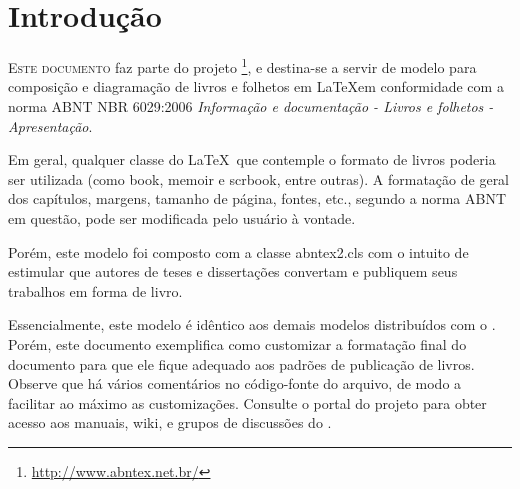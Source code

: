 \documentclass[
	10pt,				%
	openright,			%
	twoside,			%
	a5paper,			%
	english,			%
	french,				%
	brazil,				%
	sumario=tradicional
]{abntex2}
\renewcommand{\textual}{%
  \pagestyle{abntbookheadings}%
  \aliaspagestyle{chapter}{abntbookchapfirst}%
  \nouppercaseheads%
  \bookmarksetup{startatroot}%
}
\begin{document}
\listoffigures*
\cleardoublepage

\listoftables*
\cleardoublepage

\tableofcontents*
\cleardoublepage

\mainmatter

\chapter*[Introdução]{Introdução}

\lettrine[nindent=0.35em,lhang=0.40,loversize=0.3]{E}{ste documento} faz parte
do projeto \abnTeX\footnote{\url{http://www.abntex.net.br/}}, e destina-se
a servir de modelo para composição e diagramação de livros e folhetos em
\LaTeX em conformidade com a norma ABNT NBR 6029:2006 \emph{Informação e
documentação - Livros e folhetos - Apresentação}. 

Em geral, qualquer classe do \LaTeX\ que contemple o formato de livros poderia
ser utilizada (como \textsf{book}, \textsf{memoir} e \textsf{scrbook}, entre
outras). A formatação de geral dos capítulos, margens, tamanho de página,
fontes, etc., segundo a norma ABNT em questão, pode ser modificada pelo usuário
à vontade.

Porém, este modelo foi composto com a classe \textsf{abntex2.cls} com o intuito
de estimular que autores de teses e dissertações convertam e publiquem seus
trabalhos em forma de livro. 

Essencialmente, este modelo é idêntico aos demais modelos distribuídos com o
\abnTeX. Porém, este documento exemplifica como customizar a formatação final do
documento para que ele fique adequado aos padrões de publicação de livros.
Observe que há vários comentários no código-fonte do arquivo, de modo a
facilitar ao máximo as customizações. Consulte o portal do projeto para obter
acesso aos manuais, wiki, e grupos de discussões do \abnTeX.
\end{document}
